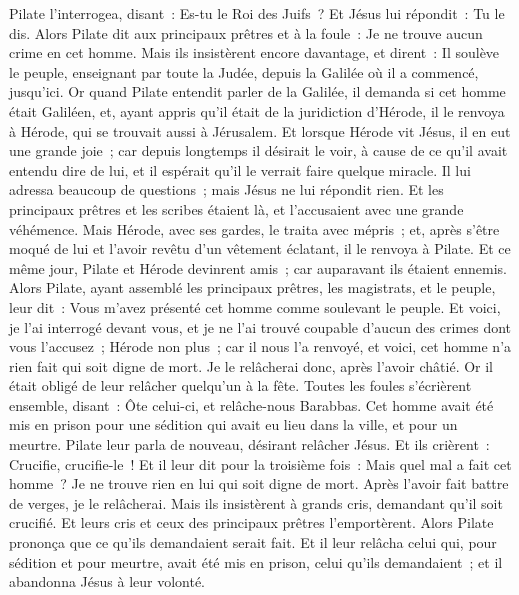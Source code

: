\begin{multicols}{2}
Pilate l'interrogea, disant~: Es-tu le Roi des Juifs~? Et Jésus lui répondit~: Tu le dis.
Alors Pilate dit aux principaux prêtres et à la foule~: Je ne trouve aucun crime en cet homme.
Mais ils insistèrent encore davantage, et dirent~: Il soulève le peuple, enseignant par toute la Judée, depuis la Galilée où il a commencé, jusqu'ici.
Or quand Pilate entendit parler de la Galilée, il demanda si cet homme était Galiléen,
et, ayant appris qu'il était de la juridiction d'Hérode, il le renvoya à Hérode, qui se trouvait aussi à Jérusalem.
Et lorsque Hérode vit Jésus, il en eut une grande joie~; car depuis longtemps il désirait le voir, à cause de ce qu'il avait entendu dire de lui, et il espérait qu'il le verrait faire quelque miracle.
Il lui adressa beaucoup de questions~; mais Jésus ne lui répondit rien.
Et les principaux prêtres et les scribes étaient là, et l'accusaient avec une grande véhémence.
Mais Hérode, avec ses gardes, le traita avec mépris~; et, après s'être moqué de lui et l'avoir revêtu d'un vêtement éclatant, il le renvoya à Pilate.
Et ce même jour, Pilate et Hérode devinrent amis~; car auparavant ils étaient ennemis.
Alors Pilate, ayant assemblé les principaux prêtres, les magistrats, et le peuple, leur dit~:
Vous m'avez présenté cet homme comme soulevant le peuple. Et voici, je l'ai interrogé devant vous, et je ne l'ai trouvé coupable d'aucun des crimes dont vous l'accusez~;
Hérode non plus~; car il nous l'a renvoyé, et voici, cet homme n'a rien fait qui soit digne de mort.
Je le relâcherai donc, après l'avoir châtié.
Or il était obligé de leur relâcher quelqu'un à la fête.
Toutes les foules s'écrièrent ensemble, disant~: Ôte celui-ci, et relâche-nous Barabbas.
Cet homme avait été mis en prison pour une sédition qui avait eu lieu dans la ville, et pour un meurtre.
Pilate leur parla de nouveau, désirant relâcher Jésus.
Et ils crièrent~: Crucifie, crucifie-le~!
Et il leur dit pour la troisième fois~: Mais quel mal a fait cet homme~? Je ne trouve rien en lui qui soit digne de mort. Après l'avoir fait battre de verges, je le relâcherai.
Mais ils insistèrent à grands cris, demandant qu'il soit crucifié. Et leurs cris et ceux des principaux prêtres l'emportèrent.
Alors Pilate prononça que ce qu'ils demandaient serait fait.
Et il leur relâcha celui qui, pour sédition et pour meurtre, avait été mis en prison, celui qu'ils demandaient~; et il abandonna Jésus à leur volonté.

\end{multicols}

